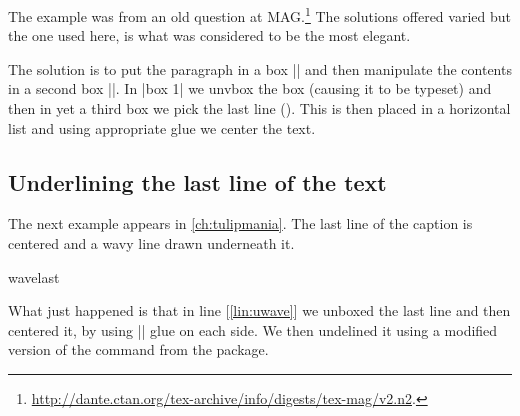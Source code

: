 The example was from an old question at \tex{}MAG.\footnote{\url{http://dante.ctan.org/tex-archive/info/digests/tex-mag/v2.n2}.} The solutions offered varied but the one used here, is what was considered to be the most elegant. 

\begin{teXXX}
\def\weirdtitle#1{%
       \bgroup
       \setbox0=\vbox{\bf\noindent #1}%
       \setbox1=\vbox{%
            \unvbox0
            \setbox2=\lastbox
            \hbox to \linewidth{\hfill\unhbox2 \hfill}%
       }%
       \unvbox1
      \egroup
  }%
\end{teXXX}

The solution is to put the paragraph in a box || and then manipulate the contents in a second box ||. In |box 1| we unvbox the box (causing it to be typeset) and then in yet a third box we pick the last line (\cmd{\lastbox}). This is then placed in a horizontal list and using appropriate glue we center the text. 

\subsection{Underlining the last line of the text}

The next example appears in \autoref{ch:tulipmania}. The last line of the caption is centered and a wavy line drawn underneath it.

\begin{scriptexample}{wavelast}{}
\end{scriptexample}

\begin{teX}
\def\wavelast#1{%
       \bgroup
       \setbox0=\vbox{\bf\noindent #1}%
       \setbox1=\vbox{%
            \unvbox0
            \setbox2=\lastbox
            \hbox to \linewidth{\hfill\uwave{\unhbox2}\hfill}(*@\label{lin:uwave}@*)%
       }%
       \unvbox1
      \egroup
  }%
\end{teX}

What just happened is that in line [\ref{lin:uwave}] we unboxed the last line and then centered it, by using |\hfill| glue on each side. We then undelined it using a modified version of the command \cmd{\uwave} from the  package.

